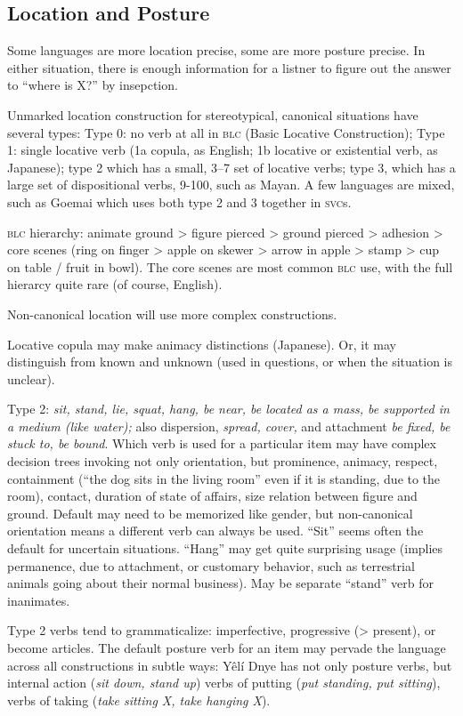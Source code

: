 \documentclass[11pt]{article}
\newcommand{\I}[1]{\textsc{#1}}   %
\begin{document}
\subsection{Location and Posture}
Some languages are more location precise, some are more posture
precise.  In either situation, there is enough information for a
listner to figure out the answer to ``where is X?'' by insepction.

Unmarked location construction for stereotypical, canonical situations
have several types: Type 0: no verb at all in \I{blc} (Basic Locative
Construction); Type 1: single locative verb (1a copula, as English; 1b
locative or existential verb, as Japanese); type 2 which has a small,
3--7 set of locative verbs; type 3, which has a large set of
dispositional verbs, 9-100, such as Mayan.  A few languages are mixed,
such as Goemai which uses both type 2 and 3 together in \I{svc}s.

\I{blc} hierarchy: animate ground > figure pierced > ground pierced >
adhesion > core scenes (ring on finger > apple on skewer > arrow in
apple > stamp > cup on table / fruit in bowl).  The core scenes are
most common \I{blc} use, with the full hierarcy quite rare (of course,
English).

Non-canonical location will use more complex constructions.  

Locative copula may make animacy distinctions (Japanese).  Or, it may
distinguish from known and unknown (used in questions, or when the
situation is unclear).

Type 2: \textit{sit, stand, lie, squat, hang, be near, be located as a
mass, be supported in a medium (like water);} also dispersion,
\textit{spread, cover,} and attachment \textit{be fixed, be stuck to,
be bound}.  Which verb is used for a particular item may have
complex decision trees invoking not only orientation, but
prominence, animacy, respect, containment (``the dog sits in the
living room'' even if it is standing, due to the room), contact,
duration of state of affairs, size relation between figure and ground.
Default may need to be memorized like gender, but non-canonical
orientation means a different verb can always be used.  ``Sit'' seems
often the default for uncertain situations.  ``Hang'' may get quite
surprising usage (implies permanence, due to attachment, or customary
behavior, such as terrestrial animals going about their normal
business).  May be separate ``stand'' verb for inanimates.

Type 2 verbs tend to grammaticalize: imperfective, progressive (>
present), or become articles.  The default posture verb for an item
may pervade the language across all constructions in subtle ways: Yêlí
Dnye has not only posture verbs, but internal action (\textit{sit
down, stand up}) verbs of putting (\textit{put standing, put
sitting}), verbs of taking (\textit{take sitting X, take hanging
X}).
\end{document}
